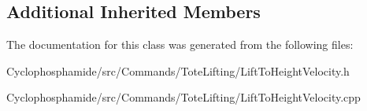 \subsection*{Additional Inherited Members}


The documentation for this class was generated from the following files\+:\begin{DoxyCompactItemize}
\item 
Cyclophosphamide/src/\+Commands/\+Tote\+Lifting/Lift\+To\+Height\+Velocity.\+h\item 
Cyclophosphamide/src/\+Commands/\+Tote\+Lifting/Lift\+To\+Height\+Velocity.\+cpp\end{DoxyCompactItemize}

